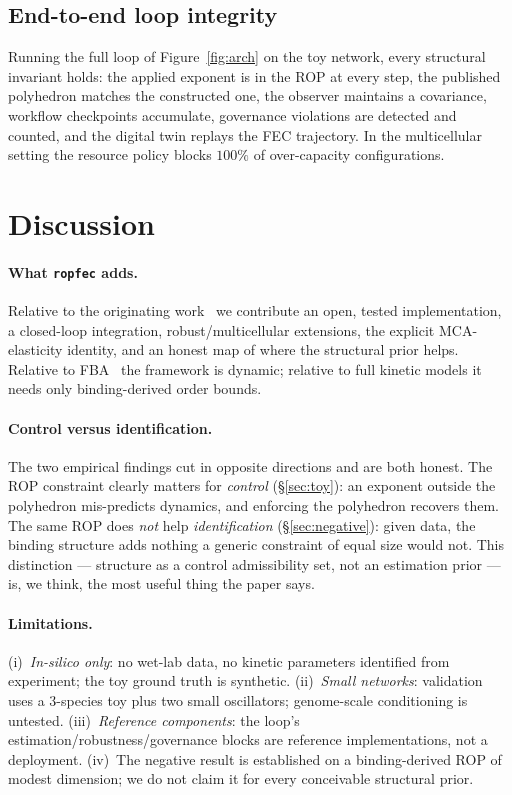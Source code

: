 \documentclass[11pt]{article}
\begin{document}
\subsection{End-to-end loop integrity}

Running the full loop of Figure~\ref{fig:arch} on the toy network, every
structural invariant holds: the applied exponent is in the ROP at every step, the
published polyhedron matches the constructed one, the observer maintains a
covariance, workflow checkpoints accumulate, governance violations are detected
and counted, and the digital twin replays the FEC trajectory. In the
multicellular setting the resource policy blocks $100\%$ of over-capacity
configurations.

\section{Discussion}\label{sec:discussion}

\paragraph{What \texttt{ropfec} adds.} Relative to the originating
work~\citep{xiao2023fec,xiao2022thesis} we contribute an open, tested
implementation, a closed-loop integration, robust/multicellular extensions, the
explicit MCA-elasticity identity, and an honest map of where the structural prior
helps. Relative to FBA~\citep{orth2010fba} the framework is dynamic; relative to
full kinetic models it needs only binding-derived order bounds.

\paragraph{Control versus identification.} The two empirical findings cut in
opposite directions and are both honest. The ROP constraint clearly matters for
\emph{control} (\S\ref{sec:toy}): an exponent outside the polyhedron mis-predicts
dynamics, and enforcing the polyhedron recovers them. The same ROP does
\emph{not} help \emph{identification} (\S\ref{sec:negative}): given data, the
binding structure adds nothing a generic constraint of equal size would not. This
distinction --- structure as a control admissibility set, not an estimation prior
--- is, we think, the most useful thing the paper says.

\paragraph{Limitations.} (i)~\emph{In-silico only}: no wet-lab data, no kinetic
parameters identified from experiment; the toy ground truth is synthetic.
(ii)~\emph{Small networks}: validation uses a $3$-species toy plus two small
oscillators; genome-scale conditioning is untested. (iii)~\emph{Reference
components}: the loop's estimation/robustness/governance blocks are reference
implementations, not a deployment. (iv)~The negative result is established on a
binding-derived ROP of modest dimension; we do not claim it for every conceivable
structural prior.
\end{document}
